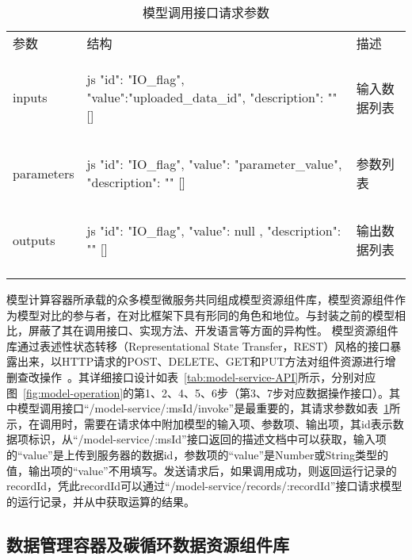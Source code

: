 \begin{table}[!htbp]
    \centering
    \caption{模型调用接口请求参数}
    \label{tab:model-invoke-API}
    \begin{tabular}{lp{}l}
        \Xhline{1.5pt}
        参数 & 结构 & 描述 \\
        \Xhline{1.5pt}
        inputs 
        & 
\begin{tabminted}[tabsize=4]{js}
{
  "id": "IO_flag", 
  "value":"uploaded_data_id",
  "description": ""
}[]
\end{tabminted}
        & 输入数据列表 \\
        \hline
        parameters 
        &
\begin{tabminted}[tabsize=4]{js}
{
  "id": "IO_flag", 
  "value": "parameter_value",
  "description": ""
}[]
\end{tabminted}
        & 参数列表 \\
        \hline
        outputs 
        &
\begin{tabminted}[tabsize=4]{js}
{ 
  "id": "IO_flag", 
  "value": null ,
  "description": ""
}[]
\end{tabminted}
        & 输出数据列表 \\
        \Xhline{1.5pt}
    \end{tabular}
\end{table}
模型计算容器所承载的众多模型微服务共同组成模型资源组件库，模型资源组件作为模型对比的参与者，在对比框架下具有形同的角色和地位。与封装之前的模型相比，屏蔽了其在调用接口、实现方法、开发语言等方面的异构性。
模型资源组件库通过表述性状态转移（Representational State Transfer，REST）风格的接口暴露出来，以HTTP请求的POST、DELETE、GET和PUT方法对组件资源进行增删查改操作~\cite{fielding2000architectural}。其详细接口设计如表~\ref{tab:model-service-API}所示，分别对应图~\ref{fig:model-operation}的第1、2、4、5、6步（第3、7步对应数据操作接口）。其中模型调用接口“/model-service/:msId/invoke”是最重要的，其请求参数如表~\ref{tab:model-invoke-API}所示，在调用时，需要在请求体中附加模型的输入项、参数项、输出项，其id表示数据项标识，从“/model-service/:msId”接口返回的描述文档中可以获取，输入项的“value”是上传到服务器的数据id，参数项的“value”是Number或String类型的值，输出项的“value”不用填写。发送请求后，如果调用成功，则返回运行记录的recordId，凭此recordId可以通过“/model-service/records/:recordId”接口请求模型的运行记录，并从中获取运算的结果。

\subsection{数据管理容器及碳循环数据资源组件库}

